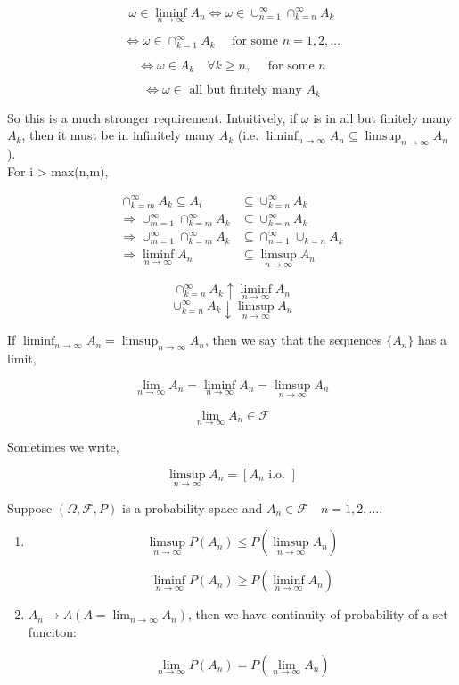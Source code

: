 \documentclass[11pt,fleqn]{book} %
\begin{document}
$$\omega \in \liminf_{n \rightarrow \infty} A_n \Leftrightarrow \omega \in \cup^\infty_{n=1} \cap^\infty_{k=n} A_k $$

$$ \Leftrightarrow \omega \in \cap^\infty_{k=1} A_k \quad \text{ for some } n=1, 2, \dots$$

$$\Leftrightarrow \omega \in A_k \quad \forall k\geq n, \quad \text{ for some } n $$

$$\Leftrightarrow \omega \in \text{ all but finitely many } A_k $$

So this is a much stronger requirement. Intuitively, if $\omega$ is in all but finitely many $A_k$, then it must be in infinitely many $A_k$ (i.e. $\liminf_{n \rightarrow \infty} A_n \subseteq \limsup_{n\rightarrow \infty} A_n$).\\ 


	For i > max(n,m), 

	\begin{align*}
		\cap_{k=m}^\infty A_k \subseteq A_i &\subseteq \cup_{k=n}^\infty A_k\\
		\Rightarrow \cup^\infty_{m=1}\cap^\infty_{k=m} A_k &\subseteq \cup_{k=n}^\infty A_k\\
		\Rightarrow \cup^\infty_{m=1}\cap^\infty_{k=m} A_k &\subseteq \cap^\infty_{n=1}\cup_{k=n} A_k\\
		\Rightarrow \liminf_{n \rightarrow \infty} A_n &\subseteq \limsup_{n \rightarrow \infty} A_n
	\end{align*}
	 
	 $$\cap^\infty_{k=n}A_k \uparrow \liminf_{n \rightarrow \infty} A_n $$
	 $$\cup^\infty_{k=n}A_k \downarrow \limsup_{n \rightarrow \infty} A_n $$

	 If $\liminf_{n \rightarrow \infty} A_n = \limsup_{n \rightarrow \infty} A_n$, then we say that the sequences $\{A_n\}$ has a limit, 

	 $$\lim_{n \rightarrow \infty} A_n = \liminf_{n \rightarrow \infty} A_n = \limsup_{n \rightarrow \infty} A_n $$

	 $$ \lim_{n \rightarrow \infty} A_n \in \mathscr{F}$$

	 Sometimes we write, 

	 $$ \limsup_{n \rightarrow \infty} A_n = [A_n \text{ i.o. }] $$

	 \begin{theorem}
	 	Suppose $(\Omega, \mathscr{F}, P)$ is a probability space and $A_n \in \mathscr{F} 	\quad n= 1, 2, \dots$.

	 	\begin{enumerate}[label = (\roman*)]
	 	 	\item $$\limsup_{n \rightarrow \infty} P( A_n) \leq P(\limsup_{n \rightarrow \infty} A_n) $$

	 	 	$$ \liminf_{n \rightarrow \infty} P( A_n) \geq P(\liminf_{n \rightarrow \infty} A_n)$$

	 	 	\item $A_n \rightarrow A (A = \lim_{n \rightarrow \infty} A_n)$, then we have continuity of probability of a set funciton: 

	 	 	$$\lim_{n \rightarrow \infty} P(A_n) = P (\lim_{n \rightarrow \infty} A_n) $$
	 	 \end{enumerate} 
	 \end{theorem}
\end{document}
